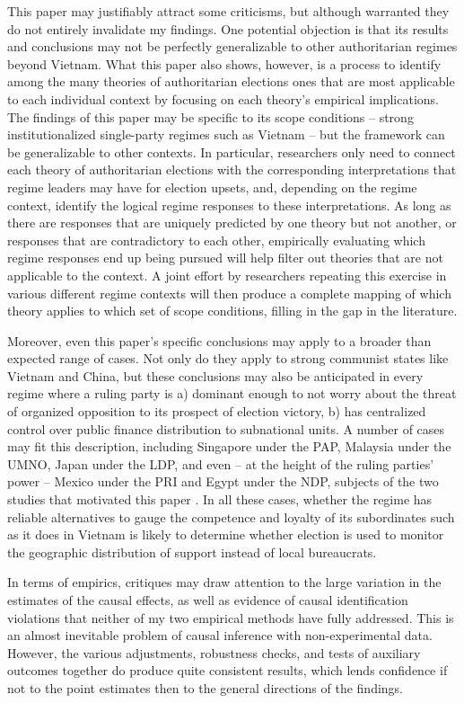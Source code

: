 \documentclass[12pt]{article}\usepackage[]{graphicx}\usepackage[]{color}
\newcommand{\1}{\mathbbm{1}}
\begin{document}
This paper may justifiably attract some criticisms, but although warranted they do not entirely invalidate my findings. One potential objection is that its results and conclusions may not be perfectly generalizable to other authoritarian regimes beyond Vietnam. What this paper also shows, however, is a process to identify among the many theories of authoritarian elections ones that are most applicable to each individual context by focusing on each theory's empirical implications. The findings of this paper may be specific to its scope conditions -- strong institutionalized single-party regimes such as Vietnam -- but the framework can be generalizable to other contexts. In particular, researchers only need to connect each theory of authoritarian elections with the corresponding interpretations that regime leaders may have for election upsets, and, depending on the regime context, identify the logical regime responses to these interpretations. As long as there are responses that are uniquely predicted by one theory but not another, or responses that are contradictory to each other, empirically evaluating which regime responses end up being pursued will help filter out theories that are not applicable to the context. A joint effort by researchers repeating this exercise in various different regime contexts will then produce a complete mapping of which theory applies to which set of scope conditions, filling in the gap in the literature.

Moreover, even this paper's specific conclusions may apply to a broader than expected range of cases. Not only do they apply to strong communist states like Vietnam and China, but these conclusions may also be anticipated in every regime where a ruling party is a) dominant enough to not worry about the threat of organized opposition to its prospect of election victory, b) has centralized control over public finance distribution to subnational units. A number of cases may fit this description, including Singapore under the PAP, Malaysia under the UMNO, Japan under the LDP, and even -- at the height of the ruling parties' power -- Mexico under the PRI and Egypt under the NDP, subjects of the two studies that motivated this paper \citep{Magaloni2006, Blaydes2008}. In all these cases, whether the regime has reliable alternatives to gauge the competence and loyalty of its subordinates such as it does in Vietnam is likely to determine whether election is used to monitor the geographic distribution of support instead of local bureaucrats.

In terms of empirics, critiques may draw attention to the large variation in the estimates of the causal effects, as well as evidence of causal identification violations that neither of my two empirical methods have fully addressed. This is an almost inevitable problem of causal inference with non-experimental data. However, the various adjustments, robustness checks, and tests of auxiliary outcomes together do produce quite consistent results, which lends confidence if not to the point estimates then to the general directions of the findings.
\end{document}
